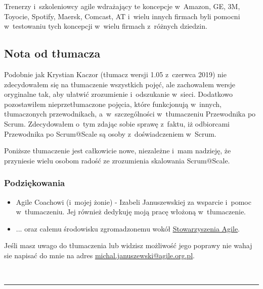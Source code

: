 \documentclass[12pt,a4paper,parskip=full]{scrartcl}
\begin{document}
Trenerzy i~szkoleniowcy agile wdrażający te koncepcje w~Amazon, GE, 3M, Toyocie, Spotify, Maersk, Comcast, AT i~wielu innych firmach byli pomocni w~testowaniu tych koncepcji w~wielu firmach z~różnych dziedzin.

\subsection{Nota od tłumacza}

Podobnie jak Krystian Kaczor (tłumacz wersji 1.05 z~czerwca 2019) nie zdecydowałem się na tłumaczenie wszystkich pojęć, ale zachowałem wersje oryginalne tak, aby ułatwić zrozumienie i~odszukanie w~sieci. Dodatkowo pozostawiłem nieprzetłumaczone pojęcia, które funkcjonują w~innych, tłumaczonych przewodnikach, a~w~szczególności w~tłumaczeniu Przewodnika po Scrum. Zdecydowałem o~tym zdając sobie sprawę z~faktu, iż odbiorcami Przewodnika po Scrum@Scale są osoby z~doświadczeniem w~Scrum. 

Poniższe tłumaczenie jest całkowicie nowe, niezależne i~mam nadzieję, że przyniesie wielu osobom radość ze zrozumienia skalowania Scrum@Scale.

\subsubsection{Podziękowania}
\begin{itemize}
	\item Agile Coachowi (i~mojej żonie) - Izabeli Januszewskiej za wsparcie i~pomoc w~tłumaczeniu. Jej również dedykuję moją pracę włożoną w~tłumaczenie.
	\item ... oraz całemu środowisku zgromadzonemu wokół \href{https://www.agile.org.pl}{\underline{Stowarzyszenia Agile}}.
\end{itemize} 
Jeśli masz uwago do tłumaczenia lub widzisz możliwość jego poprawy nie wahaj sie napisać do mnie na adres \href{mailto:michal.januszewski@agile.org.pl}{\underline{michal.januszewski@agile.org.pl}}.

~
\pagebreak
\begin{center}\rule{3in}{0.4pt}\end{center}
\end{document}
